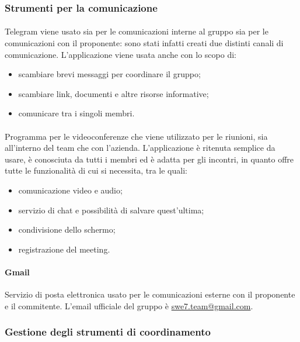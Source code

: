 \subsubsection{Strumenti per la comunicazione}
\paragraph{} \hfill \break
Telegram viene usato sia per le comunicazioni interne al gruppo sia per le comunicazioni con il proponente:
sono stati infatti creati due distinti canali di comunicazione. L'applicazione viene usata anche con lo scopo 
di:
\begin{itemize}
    \item scambiare brevi messaggi per coordinare il gruppo;
    \item scambiare link, documenti e altre risorse informative;
    \item comunicare tra i singoli membri.
\end{itemize}

\paragraph{} \hfill \break
Programma per le videoconferenze che viene utilizzato per le riunioni, sia all'interno del team che con l'azienda. L'applicazione è ritenuta semplice da usare,
è conosciuta da tutti i membri ed è adatta per gli incontri, in quanto offre tutte le funzionalità di cui si necessita, tra le quali:
\begin{itemize}
    \item comunicazione video e audio;
    \item servizio di chat e possibilità di salvare quest'ultima;
    \item condivisione dello schermo;
    \item registrazione del meeting.
\end{itemize}

\paragraph{Gmail} \hfill \break
Servizio di posta elettronica usato per le comunicazioni esterne con il proponente e il commitente. L'email 
ufficiale del gruppo è \href{mailto:swe7.team@gmail.com}{swe7.team@gmail.com}.

\subsubsection{Gestione degli strumenti di coordinamento}

